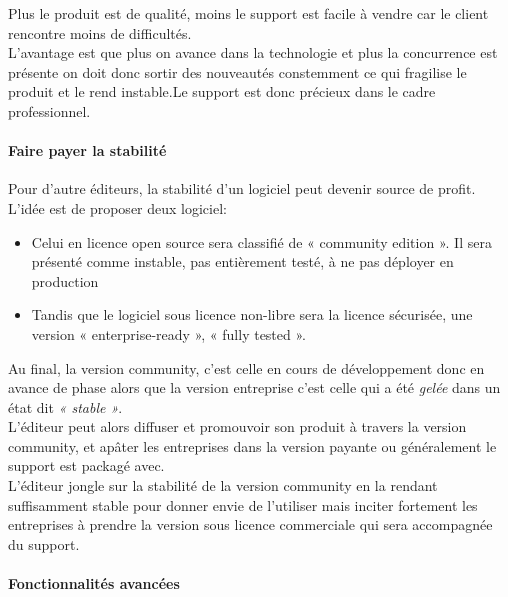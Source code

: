 			Plus le produit est de qualité, moins le support est facile à vendre car le client rencontre moins de difficultés.\\

			L'avantage est que plus on avance dans la technologie et plus la concurrence est présente on doit donc sortir des nouveautés constemment ce qui fragilise le produit et le rend instable.Le support est donc précieux dans le cadre professionnel.

			\paragraph{Faire payer la stabilité\\}

			Pour d'autre éditeurs, la stabilité d'un logiciel peut devenir source de profit. L'idée est de proposer deux logiciel:\\

			\begin{itemize}[label=\textbullet, font=\LARGE \color{burntorange}]
				\item Celui en licence open source sera classifié de « community edition ». Il sera présenté comme instable, pas entièrement testé, à ne pas déployer en production
				\item Tandis que le logiciel sous licence non-libre sera la licence sécurisée, une version « enterprise-ready », « fully tested ».
			\end{itemize} 

			Au final, la version community, c'est celle en cours de développement donc en avance de phase alors que la version entreprise c'est celle qui a été \textit{gelée} dans un état dit \textit{« stable »}.\\

			L'éditeur peut alors diffuser et promouvoir son produit à travers la version community, et apâter les entreprises dans la version payante ou généralement le support est packagé avec.\\

			L'éditeur jongle sur la stabilité de la version community en la rendant suffisamment stable pour donner envie de l'utiliser mais inciter fortement les entreprises à prendre la version sous licence commerciale qui sera accompagnée du support.

			\paragraph{Fonctionnalités avancées\\}

